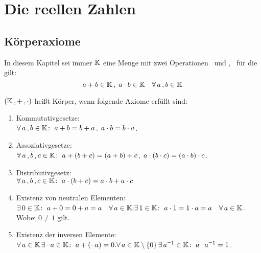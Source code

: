 \documentclass[../ana1.tex]{subfiles}
\begin{document}
\setcounter{section}{2}

\section{Die reellen Zahlen}

\subsection{Körperaxiome}
\begin{prosa}
	In diesem Kapitel sei immer \(\mathbb{K}  \) eine Menge mit zwei Operationen \gqq{\(+  \)} \, und 
	\gqq{\(\cdot \)}, \, für die gilt:
	\[a + b \in \mathbb{K} \operatorname{,}  \; a \cdot b \in \mathbb{K} \quad \forall \, a \operatorname{,} b \in \mathbb{K}  \]
\end{prosa}

\begin{defi}[Körperaxiome]
	\((\mathbb{K} \operatorname{,} + \operatorname{,} \cdot) \) heißt Körper, wenn folgende Axiome erfüllt sind:
	\begin{enumerate}[label= (K\arabic*)]
		\item\label{ax:K1}Kommutativgesetze: \\
			  \(\forall \, a \operatorname{,} b \in \mathbb{K} \colon \; a+b=b+a \operatorname{,}  \; a \cdot b = b \cdot a \).
		\item\label{ax:K2}Assoziativgesetze: \\
			  \(\forall \, a \operatorname{,} b \operatorname{,} c \in \mathbb{K} \colon \; a+(b+c) = (a+b)+c \operatorname{,}  \; a \cdot (b \cdot c) = (a \cdot b)\cdot c \).
		\item\label{ax:K3}Distributivgesetz: \\
			  \(\forall \, a \operatorname{,} b \operatorname{,} c \in \mathbb{K} \colon \; a \cdot (b+c) = a \cdot b + a \cdot c \)
		\item\label{ax:K4}Existenz von neutralen Elementen: \\
			  \(\exists \, 0 \in \mathbb{K} \colon \; a + 0 = 0 + a = a \quad \forall \, a \in \mathbb{K}. \\
				\exists \, 1 \in \mathbb{K} \colon \; a \cdot 1 = 1 \cdot a = a \quad \forall \, a \in \mathbb{K} \). \\
			  Wobei \(0 \neq 1 \) gilt. 
		\item\label{ax:K5}Existenz der inversen Elemente: \\
		      \(\forall \, a \in \K \, \exists  \, \minus a \in \K \colon \; a + (\minus a) = 0. \\
			    \forall \, a \in \K \setminus \set{0} \, \exists \, a^{\minus 1} \in \K \colon \; a \cdot a^{\minus 1} = 1 \). \\
	\end{enumerate}
\end{defi}
\end{document}
